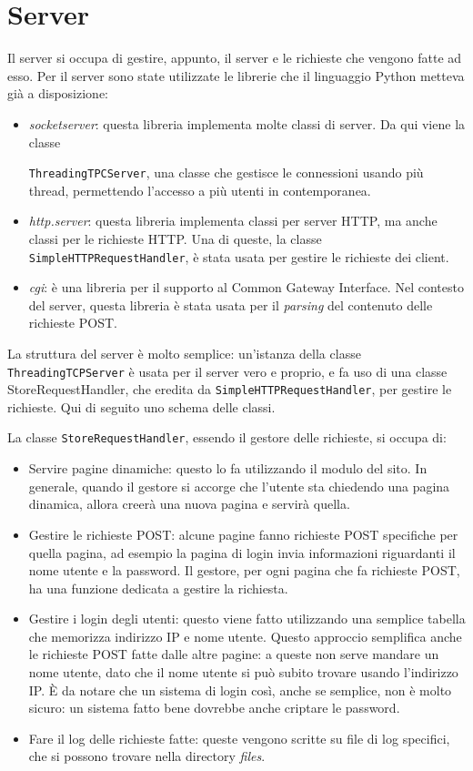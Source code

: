 \documentclass[a4paper,12pt]{report}
\begin{document}
\section{Server}

Il server si occupa di gestire, appunto, il server e le richieste che vengono fatte ad esso. Per il server sono state utilizzate le librerie che il linguaggio Python metteva già a disposizione:
\begin{itemize}
\item \textit{socketserver}: questa libreria implementa molte classi di server. Da qui viene la classe

\texttt{ThreadingTPCServer}, una classe che gestisce le connessioni usando più thread, permettendo l'accesso a più utenti in contemporanea.
\item \textit{http.server}: questa libreria implementa classi per server HTTP, ma anche classi per le richieste HTTP. Una di queste, la classe \texttt{SimpleHTTPRequestHandler}, è stata usata per gestire le richieste dei client.
\item \textit{cgi}: è una libreria per il supporto al Common Gateway Interface. Nel contesto del server, questa libreria è stata usata per il \textit{parsing} del contenuto delle richieste POST.
\end{itemize}

La struttura del server è molto semplice: un'istanza della classe \texttt{ThreadingTCPServer} è usata per il server vero e proprio, e fa uso di una classe StoreRequestHandler, che eredita da \texttt{SimpleHTTPRequestHandler}, per gestire le richieste. Qui di seguito uno schema delle classi.

La classe \texttt{StoreRequestHandler}, essendo il gestore delle richieste, si occupa di:
\begin{itemize}
\item Servire pagine dinamiche: questo lo fa utilizzando il modulo del sito. In generale, quando il gestore si accorge che l'utente sta chiedendo una pagina dinamica, allora creerà una nuova pagina e servirà quella.
\item Gestire le richieste POST: alcune pagine fanno richieste POST specifiche per quella pagina, ad esempio la pagina di login invia informazioni riguardanti il nome utente e la password. Il gestore, per ogni pagina che fa richieste POST, ha una funzione dedicata a gestire la richiesta.
\item Gestire i login degli utenti: questo viene fatto utilizzando una semplice tabella che memorizza indirizzo IP e nome utente. Questo approccio semplifica anche le richieste POST fatte dalle altre pagine: a queste non serve mandare un nome utente, dato che il nome utente si può subito trovare usando l'indirizzo IP. È da notare che un sistema di login così, anche se semplice, non è molto sicuro: un sistema fatto bene dovrebbe anche criptare le password.
\item Fare il log delle richieste fatte: queste vengono scritte su file di log specifici, che si possono trovare nella directory \textit{files}.
\end{itemize}
\end{document}

